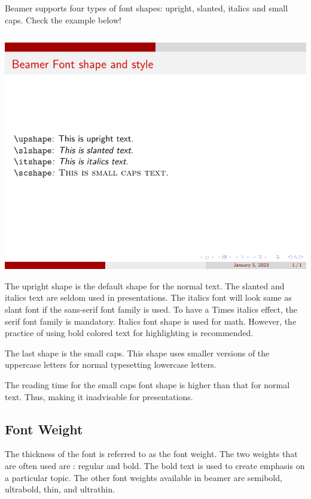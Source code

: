Beamer supports four types of font shapes: upright, slanted, italics and small caps. Check the example below!

\inputminted[linenos=true]{latex}{examples/beamer/beamerfont04.tex}

\includegraphics{examples/beamer/beamerfont04.pdf}

The upright shape is the default shape for the normal text. The slanted and italics text are seldom used in presentations. The italics font will look same as slant font if the sans-serif font family is used. To have a Times italics effect, the serif font family is mandatory. Italics font shape is used for math. However, the practice of using bold colored text for highlighting is recommended.

The last shape is the small caps. This shape uses smaller versions of the uppercase letters for normal typesetting lowercase letters.

The reading time for the small caps font shape is higher than that for normal text. Thus, making it inadvisable for presentations.

\subsection{Font Weight}

The thickness of the font is referred to as the font weight. The two weights
that are often used are : regular and bold. The bold text is used to create emphasis on a particular topic. The other font weights available in beamer are semibold, ultrabold, thin, and ultrathin.

